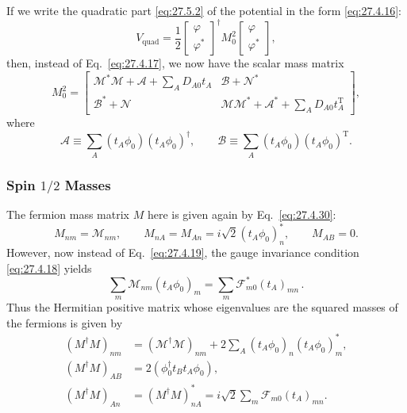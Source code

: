 If we write the quadratic part \eqref{eq:27.5.2} of the potential in the
form \eqref{eq:27.4.16}:
\[
  V_{\mathrm{quad}}
  =\frac12
  \begin{bmatrix}\varphi\\ \varphi^*\end{bmatrix}^{\!\dagger}
  M_0^2
  \begin{bmatrix}\varphi\\ \varphi^*\end{bmatrix},
\]
then, instead of Eq.~\eqref{eq:27.4.17}, we now have the scalar mass matrix
\begin{equation}
  M_0^2=
  \begin{bmatrix}
    \mathcal{M}^*\mathcal{M}+\mathcal{A}
      +\sum_A D_{A0}t_A
    &
    \mathcal{B}+\mathcal{N}^*
    \\
    \mathcal{B}^*+\mathcal{N}
    &
    \mathcal{M}\mathcal{M}^*+\mathcal{A}^*
      +\sum_A D_{A0}t_A^{\mathrm T}
  \end{bmatrix},
  \tag{27.5.4}\label{eq:27.5.4}
\end{equation}
where
\[
  \mathcal{A}\equiv
  \sum_A(t_A\phi_0)(t_A\phi_0)^\dagger,
  \qquad
  \mathcal{B}\equiv
  \sum_A(t_A\phi_0)(t_A\phi_0)^{\mathrm T}.
\]

\subsubsection*{Spin \(1/2\) Masses}

The fermion mass matrix \(M\) here is given again by
Eq.~\eqref{eq:27.4.30}:
\[
  M_{nm}=\mathcal{M}_{nm},
  \qquad
  M_{nA}=M_{An}=i\sqrt{2}(t_A\phi_0)_n^*,
  \qquad
  M_{AB}=0.
\]
However, now instead of Eq.~\eqref{eq:27.4.19}, the gauge invariance
condition \eqref{eq:27.4.18} yields
\begin{equation}
  \sum_m\mathcal{M}_{nm}(t_A\phi_0)_m
  =\sum_m\mathcal{F}_{m0}^*(t_A)_{mn}\,.
  \tag{27.5.5}\label{eq:27.5.5}
\end{equation}
Thus the Hermitian positive matrix whose eigenvalues are the squared masses
of the fermions is given by
\begin{equation}
  \begin{aligned}
  (M^\dagger M)_{nm}
  &=(\mathcal{M}^\dagger\mathcal{M})_{nm}
    +2\sum_A(t_A\phi_0)_n(t_A\phi_0)_m^*,
  \\
  (M^\dagger M)_{AB}
  &=2(\phi_0^\dagger t_Bt_A\phi_0),
  \\
  (M^\dagger M)_{An}
  &=(M^\dagger M)_{nA}^*
    =i\sqrt{2}\sum_m\mathcal{F}_{m0}(t_A)_{mn}.
  \end{aligned}
  \tag{27.5.6}\label{eq:27.5.6}
\end{equation}

